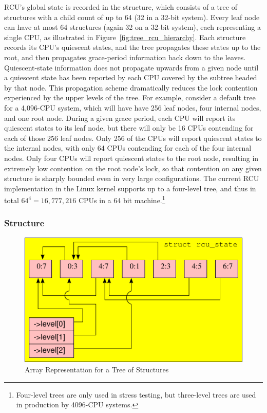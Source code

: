 RCU's global state is recorded in the  structure, which consists of 
a tree of  structures with a child count of up to 64
(32 in a 32-bit system). Every leaf node can have at most 64 
 structures (again 32 on a 32-bit system), each representing
a single CPU, as illustrated in
Figure~\ref{fig:tree_rcu_hierarchy}.
%
Each  structure records its CPU's quiescent states, and
the  tree propagates these states up to the root, and then
propagates grace-period information back down to the leaves.
%
Quiescent-state information does not propagate upwards from a given node
until a quiescent state has been reported by each CPU covered by the subtree
headed by that node.
This propagation scheme dramatically reduces the lock contention experienced
by the upper levels of the tree.
%
For example, consider a default  tree for a 4,096-CPU system,
which will have have 256 leaf nodes, four internal nodes, and one root node.
During a given grace period, each CPU will report its quiescent states
to its leaf node, but there will only be 16 CPUs contending for each of
those 256 leaf nodes.
Only 256 of the CPUs will report quiescent states to the internal nodes,
with only 64 CPUs contending for each of the four internal nodes.
Only four CPUs will report quiescent states to the root node, resulting
in extremely low contention on the root node's lock, so that contention
on any given  structure is sharply bounded even in very
large configurations.
%
The current RCU implementation in the Linux kernel supports up to a
four-level tree, and thus in total $64^4 = 16,777,216$ CPUs in a 64
bit machine.\footnote{
	Four-level trees are only used in stress testing,
	but three-level trees are used in production by 4096-CPU systems.}

\subsubsection{ Structure}

\begin{figure}[tbp]
\centering
\includegraphics[scale=0.9]{rcu_node_array.pdf}
\caption{Array Representation for a Tree of  Structures}
\label{fig:rcu_node_array}
\end{figure}

